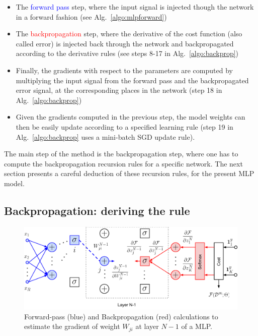 \begin{itemize}
\item The \textcolor{blue}{forward pass} step, where the input signal is injected though the network  in a forward fashion (see Alg.~\ref{algo:mlpforward})
\item The \textcolor{red}{backpropagation} step, where the derivative of the cost function (also called error) is injected back through the network and backpropagated according to the derivative rules (see steps 8-17 in Alg.~\ref{algo:backprop})
\item Finally, the gradients with respect to the parameters are computed by multiplying the input signal from the forward pass and the backpropagated error signal, at the corresponding places in the network (step 18 in Alg.~\ref{algo:backprop})
\item Given the gradients computed in the previous step, the model weights can then be easily update according to a specified learning rule (step 19 in Alg.~\ref{algo:backprop} uses a mini-batch SGD update rule).
\end{itemize}

The main step of the method is the backpropagation step, where one has to compute the backpropagation recursion rules for a specific network.
The next section presents a careful deduction of these recursion rules, for the present MLP model. 


\subsection{Backpropagation: deriving the rule}

\begin{figure}[!h]
\centering
\includegraphics[scale=0.6]{figs/deep_learning/NN_backprop_colored.pdf}
\caption{Forward-pass (blue) and Backpropagation (red) calculations to estimate the gradient of weight $W_{ji}$ at layer $N-1$ of a MLP.}
\label{fig:NN_color}
\end{figure}

